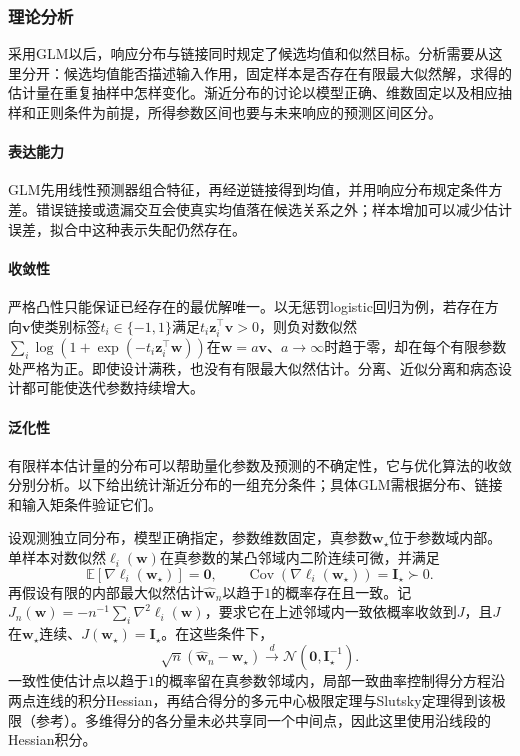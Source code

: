 \subsubsection{理论分析}
\label{sec:regression-glm-theory}

采用GLM以后，响应分布与链接同时规定了候选均值和似然目标。分析需要从这里分开：候选均值能否描述输入作用，固定样本是否存在有限最大似然解，求得的估计量在重复抽样中怎样变化。渐近分布的讨论以模型正确、维数固定以及相应抽样和正则条件为前提，所得参数区间也要与未来响应的预测区间区分。

\paragraph{表达能力}
GLM先用线性预测器组合特征，再经逆链接得到均值，并用响应分布规定条件方差。错误链接或遗漏交互会使真实均值落在候选关系之外；样本增加可以减少估计误差，拟合中这种表示失配仍然存在。

\paragraph{收敛性}
严格凸性只能保证已经存在的最优解唯一。以无惩罚logistic回归为例，若存在方向$\bm{v}$使类别标签$t_i\in\{-1,1\}$满足$t_i\bm{z}_i^{\top}\bm{v}>0$，则负对数似然$\sum_i\log(1+\exp(-t_i\bm{z}_i^{\top}\bm{w}))$在$\bm{w}=a\bm{v}$、$a\to\infty$时趋于零，却在每个有限参数处严格为正。即使设计满秩，也没有有限最大似然估计。分离、近似分离和病态设计都可能使迭代参数持续增大。

\paragraph{泛化性}
有限样本估计量的分布可以帮助量化参数及预测的不确定性，它与优化算法的收敛分别分析。以下给出统计渐近分布的一组充分条件；具体GLM需根据分布、链接和输入矩条件验证它们。

设观测独立同分布，模型正确指定，参数维数固定，真参数$\bm w_\star$位于参数域内部。单样本对数似然$\ell_i(\bm w)$在真参数的某凸邻域内二阶连续可微，并满足
\[
 \mathbb E[\nabla\ell_i(\bm w_\star)]=\bm0,\qquad
 \operatorname{Cov}(\nabla\ell_i(\bm w_\star))
 =\bm I_\star\succ0.
\]
再假设有限的内部最大似然估计$\widehat{\bm w}_n$以趋于$1$的概率存在且一致。记$J_n(\bm w)=-n^{-1}\sum_i\nabla^2\ell_i(\bm w)$，要求它在上述邻域内一致依概率收敛到$J$，且$J$在$\bm w_\star$连续、$J(\bm w_\star)=\bm I_\star$。在这些条件下，
\[
 \sqrt n(\widehat{\bm w}_n-\bm w_\star)
 \xrightarrow{d}\mathcal N(\bm0,\bm I_\star^{-1}).
\]
一致性使估计点以趋于$1$的概率留在真参数邻域内，局部一致曲率控制得分方程沿两点连线的积分Hessian，再结合得分的多元中心极限定理与Slutsky定理得到该极限（参考）。多维得分的各分量未必共享同一个中间点，因此这里使用沿线段的Hessian积分。


